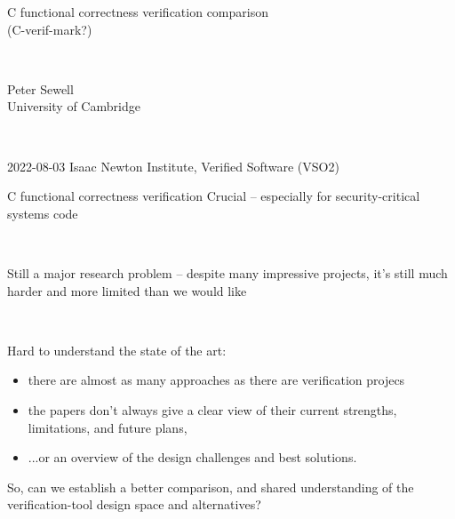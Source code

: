 \documentclass[aspectratio=169]{beamer}
\begin{document}
\begin{frame}
  \Large

  \begin{center}
    C functional correctness verification comparison\\
    (C-verif-mark?)

    \


    {\large     Peter Sewell \\
      University of Cambridge }

    \

    {\tiny    2022-08-03 Isaac Newton Institute, Verified Software (VSO2) }
  \end{center}
\end{frame}




\begin{frame}{C functional correctness verification}
Crucial -- especially for security-critical systems code

  \

  Still a major research problem -- despite many impressive projects, it's still much harder and more limited than we would like

  \

\pause
  
Hard to understand the state of the art:
\begin{itemize}
\item there are almost as many approaches as there are verification projecs
\item the papers don't always give a clear view of their current strengths, limitations, and future plans,
\item ...or an overview of the design challenges and best solutions.
\end{itemize}

\pause

So, can we establish a better comparison, and shared understanding of the verification-tool design space and alternatives?

\end{frame}
\end{document}
